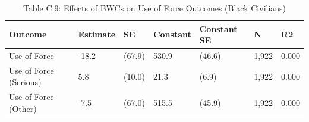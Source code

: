 \begin{table}

\caption{Table C.9: Effects of BWCs on Use of Force Outcomes (Black Civilians)}
\centering
\begin{tabular}[t]{lllllll}
\toprule
Outcome & Estimate & SE & Constant & Constant SE & N & R2\\
\midrule
Use of Force & -18.2 & (67.9) & 530.9 & (46.6) & 1,922 & 0.000\\
Use of Force (Serious) & 5.8 & (10.0) & 21.3 & (6.9) & 1,922 & 0.000\\
Use of Force (Other) & -7.5 & (67.0) & 515.5 & (45.9) & 1,922 & 0.000\\
\bottomrule
\end{tabular}
\end{table}
